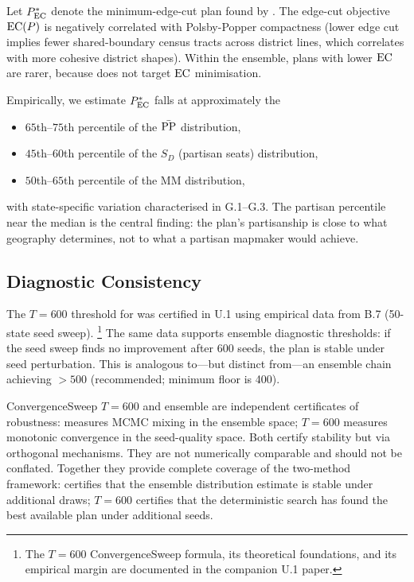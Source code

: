 Let $P^*_{\mathrm{EC}}$ denote the minimum-edge-cut plan found by \cs{}.  The
edge-cut objective $\mathrm{EC}(P)$ is negatively correlated with Polsby-Popper
compactness (lower edge cut implies fewer shared-boundary census tracts
across district lines, which correlates with more cohesive district shapes).
Within the \recom{} ensemble, plans with lower $\mathrm{EC}$ are rarer, because
\recom{} does not target $\mathrm{EC}$ minimisation.

Empirically, we estimate $P^*_{\mathrm{EC}}$ falls at approximately the
\begin{itemize}
  \item $65$th--$75$th percentile of the $\bar{\mathrm{PP}}$ distribution,
  \item $45$th--$60$th percentile of the $S_D$ (partisan seats) distribution,
  \item $50$th--$65$th percentile of the $\mathrm{MM}$ distribution,
\end{itemize}
with state-specific variation characterised in G.1--G.3.  The partisan
percentile near the median is the central finding: the \ar{} plan's
partisanship is close to what geography determines, not to what a partisan
mapmaker would achieve.

\subsection{Diagnostic Consistency}

The $T = 600$ threshold for \cs{} was certified in U.1 using empirical data
from B.7 (50-state seed sweep).%
\footnote{The $T=600$ ConvergenceSweep formula, its theoretical foundations,
and its empirical margin are documented in the companion U.1 paper.}
The same data supports ensemble diagnostic
thresholds: if the seed sweep finds no improvement after 600 seeds, the
plan is stable under seed perturbation.  This is analogous to---but distinct
from---an ensemble chain achieving \ess{} $> 500$ (recommended; minimum floor is 400).

ConvergenceSweep $T = 600$ and ensemble \ess{} are independent certificates
of robustness: \ess{} measures MCMC mixing in the ensemble space; $T = 600$
measures monotonic convergence in the seed-quality space.  Both certify
stability but via orthogonal mechanisms.  They are not numerically comparable
and should not be conflated.  Together they provide complete coverage of the
two-method framework: \ess{} certifies that the ensemble distribution estimate
is stable under additional draws; $T = 600$ certifies that the deterministic
search has found the best available plan under additional seeds.

